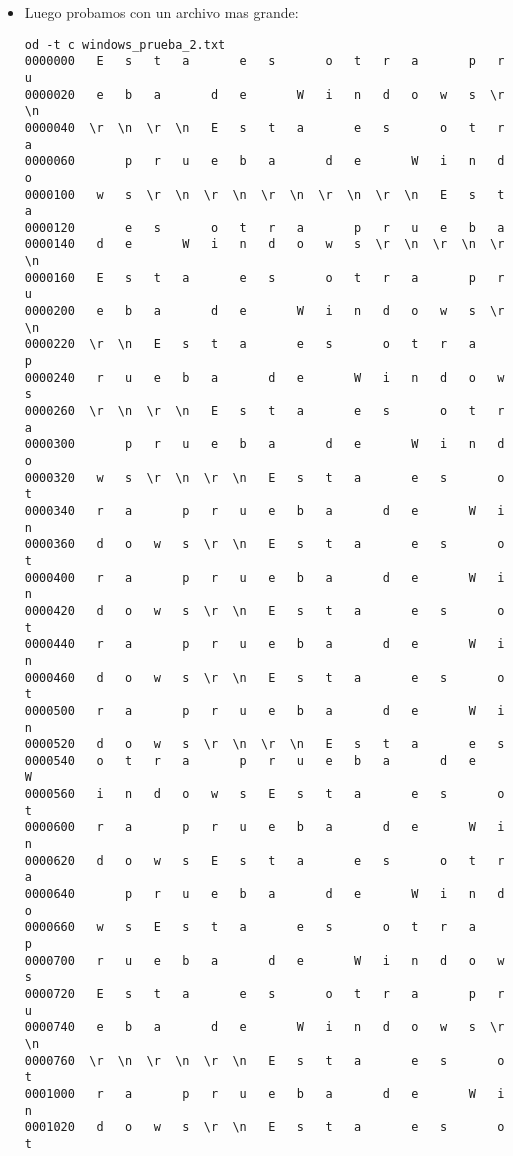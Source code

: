 \documentclass[a4paper,11pt]{article}
\begin{document}
\begin{itemize}
\item Luego probamos con un archivo mas grande:
\begin{verbatim}
od -t c windows_prueba_2.txt 
0000000   E   s   t   a       e   s       o   t   r   a       p   r   u
0000020   e   b   a       d   e       W   i   n   d   o   w   s  \r  \n
0000040  \r  \n  \r  \n   E   s   t   a       e   s       o   t   r   a
0000060       p   r   u   e   b   a       d   e       W   i   n   d   o
0000100   w   s  \r  \n  \r  \n  \r  \n  \r  \n  \r  \n   E   s   t   a
0000120       e   s       o   t   r   a       p   r   u   e   b   a    
0000140   d   e       W   i   n   d   o   w   s  \r  \n  \r  \n  \r  \n
0000160   E   s   t   a       e   s       o   t   r   a       p   r   u
0000200   e   b   a       d   e       W   i   n   d   o   w   s  \r  \n
0000220  \r  \n   E   s   t   a       e   s       o   t   r   a       p
0000240   r   u   e   b   a       d   e       W   i   n   d   o   w   s
0000260  \r  \n  \r  \n   E   s   t   a       e   s       o   t   r   a
0000300       p   r   u   e   b   a       d   e       W   i   n   d   o
0000320   w   s  \r  \n  \r  \n   E   s   t   a       e   s       o   t
0000340   r   a       p   r   u   e   b   a       d   e       W   i   n
0000360   d   o   w   s  \r  \n   E   s   t   a       e   s       o   t
0000400   r   a       p   r   u   e   b   a       d   e       W   i   n
0000420   d   o   w   s  \r  \n   E   s   t   a       e   s       o   t
0000440   r   a       p   r   u   e   b   a       d   e       W   i   n
0000460   d   o   w   s  \r  \n   E   s   t   a       e   s       o   t
0000500   r   a       p   r   u   e   b   a       d   e       W   i   n
0000520   d   o   w   s  \r  \n  \r  \n   E   s   t   a       e   s    
0000540   o   t   r   a       p   r   u   e   b   a       d   e       W
0000560   i   n   d   o   w   s   E   s   t   a       e   s       o   t
0000600   r   a       p   r   u   e   b   a       d   e       W   i   n
0000620   d   o   w   s   E   s   t   a       e   s       o   t   r   a
0000640       p   r   u   e   b   a       d   e       W   i   n   d   o
0000660   w   s   E   s   t   a       e   s       o   t   r   a       p
0000700   r   u   e   b   a       d   e       W   i   n   d   o   w   s
0000720   E   s   t   a       e   s       o   t   r   a       p   r   u
0000740   e   b   a       d   e       W   i   n   d   o   w   s  \r  \n
0000760  \r  \n  \r  \n  \r  \n   E   s   t   a       e   s       o   t
0001000   r   a       p   r   u   e   b   a       d   e       W   i   n
0001020   d   o   w   s  \r  \n   E   s   t   a       e   s       o   t

\end{verbatim}
\end{itemize}
\end{document}
